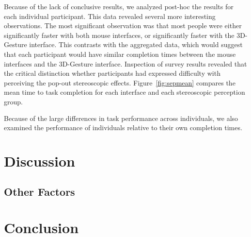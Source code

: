\documentclass[pageno]{jpaper}
\begin{document}
Because of the lack of conclusive results, we analyzed post-hoc the results for each individual participant. This data revealed several more interesting observations.
The most significant observation was that most people were either significantly faster with both mouse interfaces, or significantly faster with the 3D-Gesture interface.
This contrasts with the aggregated data, which would suggest that each participant would have similar completion times between the mouse interfaces and the 3D-Gesture
interface. Inspection of survey results revealed that the critical distinction whether participants had expressed difficulty with perceiving
the pop-out stereoscopic effects. Figure~\ref{fig:sepmean} compares the mean time to task completion for each interface and each stereoscopic perception group.

Because of the large differences in task performance across individuals, we also examined the performance of individuals relative to their own completion times.


\section{Discussion}
\subsection{Other Factors}
\section{Conclusion}

\newpage
{}


\end{document}
